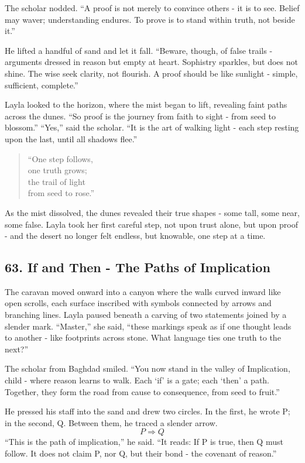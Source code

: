 \documentclass[
  letterpaper,
  DIV=11,
  numbers=noendperiod]{scrreprt}
\begin{document}
The scholar nodded. ``A proof is not merely to convince others - it is
to see. Belief may waver; understanding endures. To prove is to stand
within truth, not beside it.''

He lifted a handful of sand and let it fall. ``Beware, though, of false
trails - arguments dressed in reason but empty at heart. Sophistry
sparkles, but does not shine. The wise seek clarity, not flourish. A
proof should be like sunlight - simple, sufficient, complete.''

Layla looked to the horizon, where the mist began to lift, revealing
faint paths across the dunes. ``So proof is the journey from faith to
sight - from seed to blossom.'' ``Yes,'' said the scholar. ``It is the
art of walking light - each step resting upon the last, until all
shadows flee.''

\begin{quote}
``One step follows,\\
one truth grows;\\
the trail of light\\
from seed to rose.''
\end{quote}

As the mist dissolved, the dunes revealed their true shapes - some tall,
some near, some false. Layla took her first careful step, not upon trust
alone, but upon proof - and the desert no longer felt endless, but
knowable, one step at a time.

\subsection{63. If and Then - The Paths of
Implication}\label{if-and-then---the-paths-of-implication}

The caravan moved onward into a canyon where the walls curved inward
like open scrolls, each surface inscribed with symbols connected by
arrows and branching lines. Layla paused beneath a carving of two
statements joined by a slender mark. ``Master,'' she said, ``these
markings speak as if one thought leads to another - like footprints
across stone. What language ties one truth to the next?''

The scholar from Baghdad smiled. ``You now stand in the valley of
Implication, child - where reason learns to walk. Each `if' is a gate;
each `then' a path. Together, they form the road from cause to
consequence, from seed to fruit.''

He pressed his staff into the sand and drew two circles. In the first,
he wrote P; in the second, Q. Between them, he traced a slender arrow.
\[
P \Rightarrow Q
\] ``This is the path of implication,'' he said. ``It reads: If P is
true, then Q must follow. It does not claim P, nor Q, but their bond -
the covenant of reason.''
\end{document}
